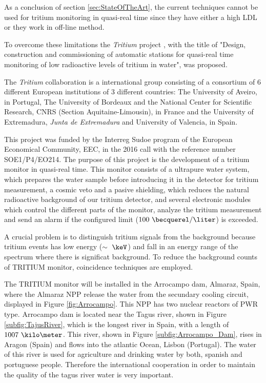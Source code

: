 As a conclusion of section \ref{sec:StateOfTheArt}, the current techniques cannot be used for tritium monitoring in quasi-real time since they have either a high LDL or they work in off-line method. 

To overcome these limitations the \textit{Tritium} project \cite{TRITIUM}, with the title of "Design, construction and commissioning of automatic stations for quasi-real time monitoring of low radioactive levels of tritium in water", was proposed.

The \textit{Tritium} collaboration is a international group consisting of a consortium of 6 different European institutions of 3 different countries: The University of Aveiro, in Portugal, The University of Bordeaux and the National Center for Scientific Research, CNRS  (Section Aquitaine-Limousin), in France and the University of Extremadura, \textit{Junta de Extremadura} and University of Valencia, in Spain.

This project was funded by the Interreg Sudoe program of the European Economical Community, EEC, in the 2016 call with the reference number SOE1/P4/EO214. The purpose of this project is the development of a tritium monitor in quasi-real time. This monitor consists of a ultrapure water system, which prepares the water sample before introducing it in the detector for tritium measurement, a cosmic veto and a pasive shielding, which reduces the natural radioactive background of our tritium detector, and several electronic modules which control the different parts of the monitor, analyze the tritium measurement and send an alarm if the configured limit ($100~\becquerel/\liter$) is exceeded.

A crucial problem is to distinguish tritium signals from the background because tritium events has low energy ($\sim~\keV$) and fall in an energy range of the spectrum where there is significat background. To reduce the background counts of TRITIUM monitor, coincidence techniques are employed.


The TRITIUM monitor will be installed in the Arrocampo dam, Almaraz, Spain, where the Almaraz NPP release the water from the secundary cooling circuit, displayed in Figure \ref{fig:Arrocampo}. This NPP has two nuclear reactors of PWR type. Arrocampo dam is located near the Tagus river, shown in Figure \ref{subfig:TajusRiver}, which is the longest river in Spain, with a length of $1007~\kilo\meter$. This river, shown in Figure \ref{subfig:Arrocampo_Dam}, rises in Aragon (Spain) and flows into the atlantic Ocean, Lisbon (Portugal). The water of this river is used for agriculture and drinking water by both, spanish and portuguese people. Therefore the international cooperation in order to maintain the quality of the tagus river water is very important.

